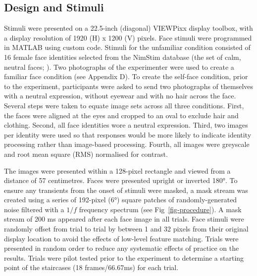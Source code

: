 \documentclass[
  10pt,
  letterpaper,
]{article}
\begin{document}
\subsection{Design and Stimuli}\label{design-and-stimuli}

Stimuli were presented on a 22.5-inch (diagonal) VIEWPixx display
toolbox, with a display resolution of 1920 (H) x 1200 (V) pixels. Face
stimuli were programmed in MATLAB using custom code. Stimuli for the
unfamiliar condition consisted of 16 female face identities selected
from the NimStim database (the set of calm, neutral faces;
\citet{tottenham2009a}). Two photographs of the experimenter were used
to create a familiar face condition (see Appendix D). To create the
self-face condition, prior to the experiment, participants were asked to
send two photographs of themselves with a neutral expression, without
eyewear and with no hair across the face. Several steps were taken to
equate image sets across all three conditions. First, the faces were
aligned at the eyes and cropped to an oval to exclude hair and clothing.
Second, all face identities wore a neutral expression. Third, two images
per identity were used so that responses would be more likely to
indicate identity processing rather than image-based processing. Fourth,
all images were greyscale and root mean square (RMS) normalised for
contrast.

The images were presented within a 128-pixel rectangle and viewed from a
distance of 57 centimetres. Faces were presented upright or inverted
180°. To ensure any transients from the onset of stimuli were masked, a
mask stream was created using a series of 192-pixel (6°) square patches
of randomly-generated noise filtered with a \(1/f\) frequency spectrum
(see Fig~\ref{fig-procedure}). A mask stream of 200 ms appeared after
each face image in all trials. Face stimuli were randomly offset from
trial to trial by between 1 and 32 pixels from their original display
location to avoid the effects of low-level feature matching. Trials were
presented in random order to reduce any systematic effects of practice
on the results. Trials were pilot tested prior to the experiment to
determine a starting point of the staircases (18 frames/66.67ms) for
each trial.
\end{document}
